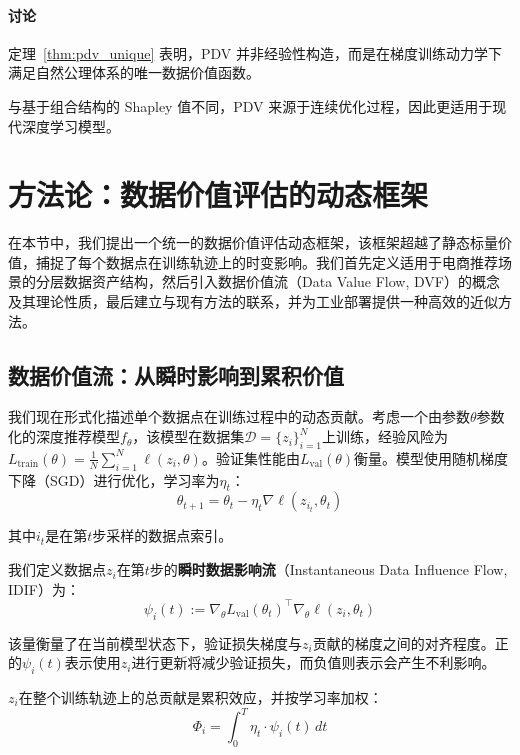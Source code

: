 \documentclass[12pt,a4paper]{ctexart}
\theoremstyle{definition}
\theoremstyle{plain}
\begin{document}
\paragraph{讨论}
定理~\ref{thm:pdv_unique} 表明，PDV 并非经验性构造，而是在梯度训练动力学下满足自然公理体系的唯一数据价值函数。

与基于组合结构的 Shapley 值不同，PDV 来源于连续优化过程，因此更适用于现代深度学习模型。

\section{方法论：数据价值评估的动态框架}

在本节中，我们提出一个统一的数据价值评估动态框架，该框架超越了静态标量价值，捕捉了每个数据点在训练轨迹上的时变影响。我们首先定义适用于电商推荐场景的分层数据资产结构，然后引入数据价值流（Data Value Flow, DVF）的概念及其理论性质，最后建立与现有方法的联系，并为工业部署提供一种高效的近似方法。

\subsection{数据价值流：从瞬时影响到累积价值}

我们现在形式化描述单个数据点在训练过程中的动态贡献。考虑一个由参数\(\theta\)参数化的深度推荐模型\(f_{\theta}\)，该模型在数据集\(\mathcal{D} = \{z_i\}_{i=1}^{N}\)上训练，经验风险为\(L_{\text{train}}(\theta) = \frac{1}{N}\sum_{i=1}^N \ell(z_i,\theta)\)。验证集性能由\(L_{\text{val}}(\theta)\)衡量。模型使用随机梯度下降（SGD）进行优化，学习率为\(\eta_t\)：
\begin{equation}
\theta_{t+1} = \theta_t - \eta_t \nabla \ell(z_{i_t}, \theta_t)
\end{equation}

其中\(i_t\)是在第\(t\)步采样的数据点索引。

我们定义数据点\(z_i\)在第\(t\)步的\textbf{瞬时数据影响流}（Instantaneous Data Influence Flow, IDIF）为：
\begin{equation}
\psi_i(t) := \nabla_{\theta} L_{\text{val}}(\theta_t)^{\top} \nabla_{\theta} \ell(z_i, \theta_t)
\end{equation}

该量衡量了在当前模型状态下，验证损失梯度与\(z_i\)贡献的梯度之间的对齐程度。正的\(\psi_i(t)\)表示使用\(z_i\)进行更新将减少验证损失，而负值则表示会产生不利影响。

\(z_i\)在整个训练轨迹上的总贡献是累积效应，并按学习率加权：
\begin{equation}
\Phi_i = \int_{0}^{T} \eta_t \cdot \psi_i(t) \, dt
\end{equation}
\end{document}
